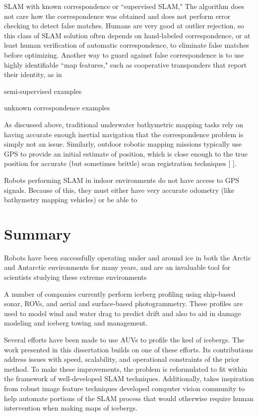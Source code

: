 SLAM with known correspondence or ``supervised SLAM,"   The algorithm does not care how the correspondence was obtained and does not perform error checking to detect false matches. Humans are very good at outlier rejection, so this class of SLAM solution often depends on hand-labeled correspondence, or at least human verification of automatic correspondence, to eliminate false matches before optimizing. Another way to guard against false correspondence is to use highly identifiable ``map features," such as cooperative transponders that report their identity, as in \cite{?} 

semi-supervised examples

unknown correspondence examples

As discussed above, traditional underwater bathymetric mapping tasks rely on having accurate enough inertial navigation that the correspondence problem is simply not an issue. Similarly, outdoor robotic mapping missions typically use GPS to provide an initial estimate of position, which is close enough to the true position for accurate (but sometimes brittle) scan registration techniques [\cite{OriginalGraphSLAM?} \cite{stanley?} \cite{ICP}].

Robots performing SLAM in indoor environments do not have access to GPS signals. Because of this, they must either have very accurate odometry (like bathymetry mapping vehicles) or be able to 


\section{Summary}

Robots have been successfully operating under and around ice in both the Arctic and Antarctic environments for many years, and are an invaluable tool for scientists studying these extreme environments

A number of companies currently perform iceberg profiling using ship-based sonar, ROVs, and aerial and surface-based photogrammetry. These profiles are used to model wind and water drag to predict drift and also to aid in damage modeling and iceberg towing and management. 

Several efforts have been made to use AUVs to profile the keel of icebergs. The work presented in this dissertation builds on one of these efforts. Its contributions address issues with speed, scalability, and operational constraints of the prior method. To make these improvements, the problem is reformulated to fit within the framework of well-developed SLAM techniques. Additionally, takes inspiration from robust image feature techniques developed computer vision community to help automate portions of the SLAM process that would otherwise require human intervention when making maps of icebergs.


